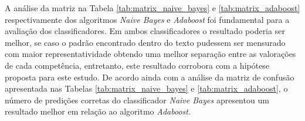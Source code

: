A análise da matriz na Tabela 
\ref{tab:matrix_naive_bayes} e \ref{tab:matrix_adaboost} respectivamente dos 
algoritmos \textit{Naive Bayes} e \textit{Adaboost} foi fundamental para a
avaliação dos classificadores. Em ambos classificadores o resultado poderia ser 
melhor, se caso o padrão encontrado dentro do texto pudessem ser mensurado com 
maior representatividade obtendo uma melhor separação entre as valorações de 
cada competência, entretanto, este resultado corrobora com a hipótese proposta 
para este estudo. De acordo ainda com a análise da matriz de confusão 
apresentada nas Tabelas \ref{tab:matrix_naive_bayes} e 
\ref{tab:matrix_adaboost}, o número de predições corretas do classificador 
\textit{Naive Bayes} apresentou um resultado melhor em relação 
ao algoritmo \textit{Adaboost}. 
